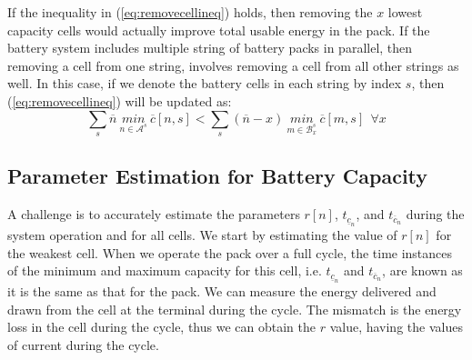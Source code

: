 \documentclass[10pt,twocolumn]{IEEEtran}
\begin{document}
If the inequality in (\ref{eq:removecellineq}) holds, then removing the $x$ lowest capacity cells would actually improve total usable energy in the pack. 
If the battery system includes multiple string of battery packs in parallel, then removing a cell from one string, involves removing a cell from all other strings as well.
In this case, if we denote the battery cells in each string by index $s$,  then (\ref{eq:removecellineq}) will be updated  as:
%
\begin{equation}
\sum_{s} \overline{n} \  \underset{n\in \mathcal{A}^s}{min} \ \overline c[n,s] <  \sum_{s}(\overline{n}-x) \ \underset{m\in \mathcal{B}^{s}_x}{min} \ \overline c[m,s] \ \  \forall x
\label{eq:removecellineq2}
\end{equation}
%
\subsection{Parameter Estimation for Battery Capacity} \label{sec:parameter_estimation}

A challenge is to accurately estimate the parameters  $r[n]$, $t_{\underline{c}_n} $,  and $t_{\overline{c}_n} $  during the system operation and for all cells. %
%
We start by estimating the value of $r[n]$ for the weakest cell. 
When we operate the pack over a full cycle, the time instances of the  minimum and maximum capacity for this cell, i.e. $t_{\underline{c}_n} $  and $t_{\overline{c}_n} $,  are known as it is the same as that for the pack.
We can  measure the energy delivered and drawn from the cell at the terminal during the cycle.
The mismatch is the energy loss in the cell during the cycle, thus we can obtain the $r$ value, having the values of current during the cycle.
\end{document}
